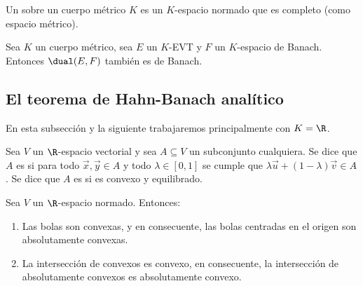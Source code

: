 \documentclass[topologia-analisis.tex]{subfiles}
\begin{document}
\begin{mydef}
	Un  sobre un cuerpo métrico $K$ es un $K$-espacio normado que es completo (como espacio métrico).
\end{mydef}
\begin{prop}
	Sea $K$ un cuerpo métrico, sea $E$ un $K$-EVT y $F$ un $K$-espacio de Banach.
	Entonces $\dual(E, F)$ también es de Banach.
\end{prop}

\subsection{El teorema de Hahn-Banach analítico}
En esta subsección y la siguiente trabajaremos principalmente con $K = \R$.
\begin{mydefi}
	Sea $V$ un $\R$-espacio vectorial y sea $A \subseteq V$ un subconjunto cualquiera.
	Se dice que $A$ es  si para todo $\vec x,\vec y\in A$ y todo $\lambda\in[0,1]$
	se cumple que $\lambda\vec u + (1-\lambda)\vec v \in A$.
	Se dice que $A$ es  si es convexo y equilibrado.
\end{mydefi}

\begin{prop}
	Sea $V$ un $\R$-espacio normado. Entonces:
	\begin{enumerate}
		\item Las bolas son convexas, y en consecuente, las bolas centradas en el origen son absolutamente convexas.
		\item La intersección de convexos es convexo, en consecuente, la intersección de absolutamente convexos es absolutamente convexo.
	\end{enumerate}
\end{prop}
\end{document}
